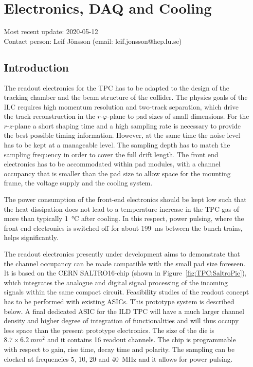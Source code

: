 \section{Electronics, DAQ and Cooling}
\label{chap:TPC_sec:electronics}
Most recent update: 2020-05-12 \\
Contact person: Leif J{\"o}nsson (email: leif.jonsson@hep.lu.se)

\subsection{Introduction}
The readout electronics for the TPC has to be adapted to the design of the tracking chamber and the beam structure of the collider. The physics goals of the ILC requires high momentum resolution and two-track separation, which drive the track reconstruction in the $r\text{-}\varphi$-plane to pad sizes of small dimensions. For the $r\text{-}z$-plane a short shaping time and a high sampling rate is necessary to provide the best possible timing information. However, at the same time the noise level has to be kept at a manageable level. The sampling depth has to match the sampling frequency in order to cover the full drift length. The front end electronics has to be accommodated within pad modules, with a channel occupancy that is smaller than the pad size to allow space for the mounting frame, the voltage supply and the cooling system.

The power consumption of the front-end electronics should be kept low such that the heat dissipation does not lead to a temperature increase in the TPC-gas of more than typically \SI{1}{\degreeCelsius} after cooling. In this respect, power pulsing, where the front-end electronics is switched off for about \SI{199}{ms} between the bunch trains, helps significantly.

The readout electronics presently under development aims to demonstrate that the channel occupancy can be made compatible with the small pad size foreseen. It is based on the CERN SALTRO16-chip (shown in Figure~\ref{fig:TPC:SaltroPic}), which integrates the analogue and digital signal processing of the incoming signals within the same compact circuit. Feasibility studies of the readout concept has to be performed with existing ASICs. This prototype system is described below. A final dedicated ASIC for the ILD TPC will have a much larger channel density and higher degree of integration of functionalities and will thus occupy less space than the present prototype electronics. The size of the die is $8.7 \times \SI{6.2}{mm^2}$ and it contains 16 readout channels. The chip is programmable with respect to gain, rise time, decay time and polarity. The sampling can be clocked at frequencies 5, 10, 20 and \SI{40}{MHz} and it allows for power pulsing.

